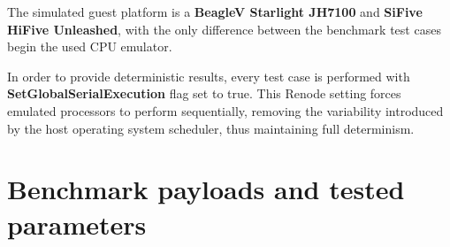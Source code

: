 The simulated guest platform is a \textbf{BeagleV Starlight JH7100} and \textbf{SiFive HiFive Unleashed},
with the only difference between the benchmark test cases begin the used CPU emulator.

In order to provide deterministic results, every test case is performed with \textbf{SetGlobalSerialExecution}
flag set to true. This Renode setting forces emulated processors to perform sequentially, removing the variability
introduced by the host operating system scheduler, thus maintaining full determinism.

\pagebreak

\section{Benchmark payloads and tested parameters}

